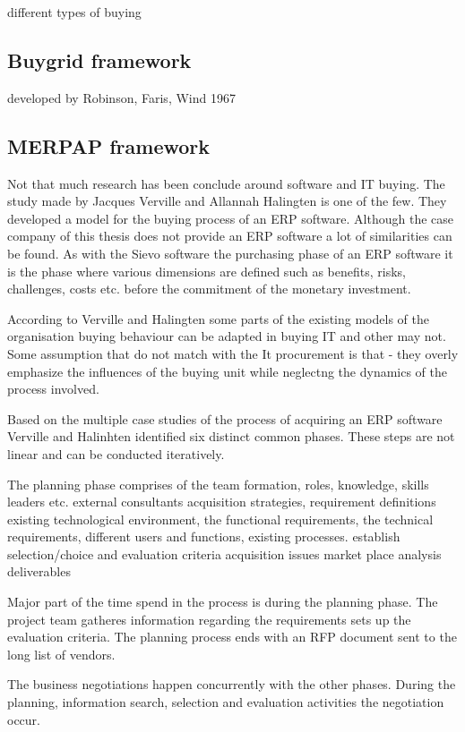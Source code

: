 \documentclass[12pt,a4paper,oneside,pdftex]{report}
\begin{document}
{{different types of buying

\subsection{Buygrid framework}

developed by Robinson, Faris, Wind 1967

\subsection{MERPAP framework}
Not that much research has been conclude around software and IT buying. The study made by Jacques Verville and Allannah Halingten is one of the few. They developed a model for the buying process of an ERP software. Although the case company of this thesis does not provide an ERP software a lot of similarities can be found. As with the Sievo software the purchasing phase of an ERP software it is the phase where various dimensions are defined such as benefits, risks, challenges, costs etc. before the commitment of the monetary investment. 

According to Verville and Halingten some parts of the existing models of the organisation buying behaviour can be adapted in buying IT and other may not. Some assumption that do not match with the It procurement is that
- they overly emphasize the influences of the buying unit while neglectng the dynamics of the process involved. 

Based on the multiple case studies of the process of acquiring an ERP software Verville and Halinhten identified six distinct common phases. These steps are not linear and can be conducted iteratively. 

The planning phase comprises of the team formation, roles, knowledge, skills leaders etc. external consultants
acquisition strategies, requirement definitions existing technological environment, the functional requirements, the technical requirements, different users and functions, existing processes. 
establish selection/choice and evaluation criteria
acquisition issues
market place analysis
deliverables

Major part of the time spend in the process is during the planning phase. The project team gatheres information regarding the requirements sets up the evaluation criteria. The planning process ends with an RFP document sent to the long list of vendors. 

The business negotiations happen concurrently with the other phases. During the planning, information search, selection and evaluation activities the negotiation occur. 

}}
\end{document}
